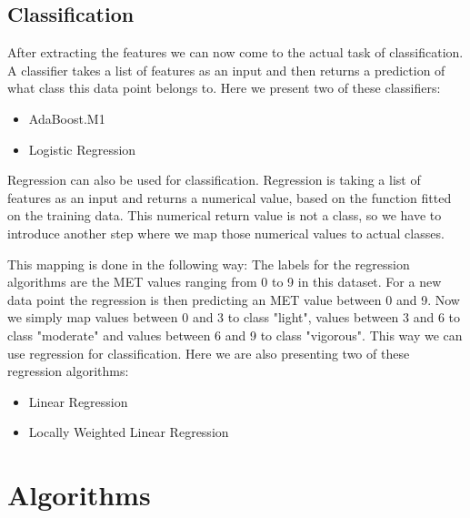 \documentclass[12pt, a4paper, onecolumn, oneside, parskip=half]{scrartcl}
\begin{document}


\subsection{Classification}

After extracting the features we can now come to the actual task of classification. A classifier takes a list of features as an input and then returns a prediction of what class this data point belongs to. Here we present two of these classifiers:
\begin{itemize}
\item AdaBoost.M1
\item Logistic Regression
\end{itemize}

Regression can also be used for classification. Regression is taking a list of features as an input and returns a numerical value, based on the function fitted on the training data. This numerical return value is not a class, so we have to introduce another step where we map those numerical values to actual classes.

This mapping is done in the following way: The labels for the regression algorithms are the MET values ranging from 0 to 9 in this dataset. For a new data point the regression is then predicting an MET value between 0 and 9. Now we simply map values between 0 and 3 to class "light", values between 3 and 6 to class "moderate" and values between 6 and 9 to class "vigorous". This way we can use regression for classification. Here we are also presenting two of these regression algorithms:
\begin{itemize}
\item Linear Regression
\item Locally Weighted Linear Regression
\end{itemize}


\section{Algorithms}
\end{document}
